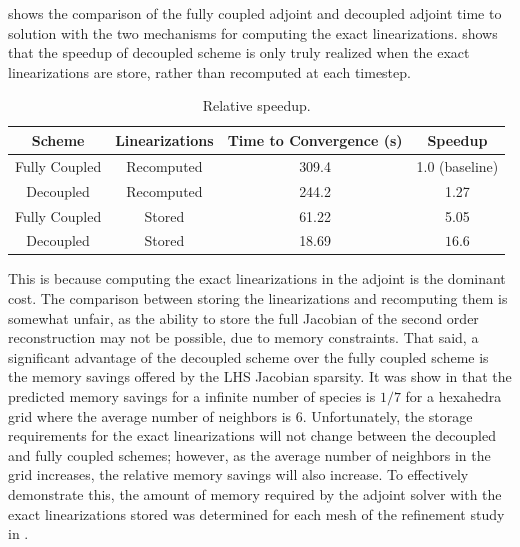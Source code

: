  shows the comparison of the fully coupled adjoint and 
decoupled adjoint time to solution with the two mechanisms for computing the
exact linearizations.   shows that the speedup of
decoupled scheme is only truly realized when the exact linearizations are store,
rather than recomputed at each timestep. 
\begin{table}[h]
  \centering
  \begin{tabular}{c|c|c|c}
    Scheme & Linearizations & Time to Convergence (s) & Speedup \\
    \hline
    Fully Coupled & Recomputed  & 309.4 & 1.0 (baseline)\\
    Decoupled     & Recomputed  & 244.2 & 1.27 \\
    Fully Coupled & Stored      & 61.22 & 5.05 \\
    Decoupled     & Stored      & 18.69 & $\mathbf{16.6}$ \\
  \end{tabular}
  \caption{Relative speedup.}
  \label{tab:srp-rel-speedup}
\end{table}
This is because computing the exact linearizations in the adjoint is the
dominant cost.  The comparison between storing the linearizations and
recomputing them is somewhat unfair, as the ability to store the full Jacobian
of the second order reconstruction may not be possible, due to memory
constraints.  That said, a significant advantage of the decoupled scheme over
the fully coupled scheme is the memory savings offered by the LHS Jacobian
sparsity. It was show in  that the
predicted memory savings for a infinite number of species is $1/7$ for a
hexahedra grid where the average number of neighbors is 6.  Unfortunately, the
storage requirements for the exact linearizations will not change between the
decoupled and fully coupled schemes; however, as the average number of neighbors
in the grid increases, the relative memory savings will also increase.  To
effectively demonstrate this, the amount of memory required by the adjoint
solver with the exact linearizations stored was determined for each mesh of the
refinement study in .
